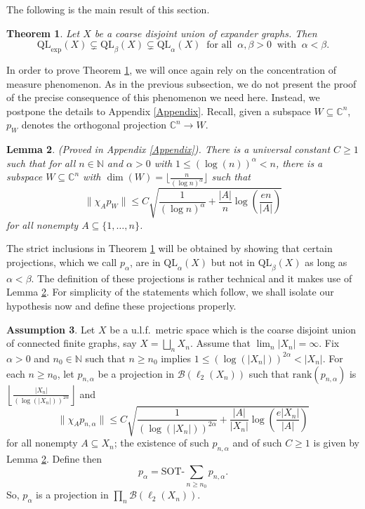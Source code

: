 \documentclass[11pt]{amsart}
\newcommand{\N}{\mathbb{N}}
\newcommand{\C}{\mathbb{C}}
\newcommand{\cB}{\mathcal{B}}
\newcommand{\SOTh}{\mathrm{SOT}\text{-}}
\numberwithin{equation}{section}
\newtheorem{theorem}{Theorem}[section]
\newtheorem{lemma}[theorem]{Lemma}
\theoremstyle{definition}
\newtheorem{assumption}[theorem]{Assumption}
\theoremstyle{remark}
\begin{document}
The following is the main result of this section.

\begin{theorem}\label{Thm.Inclusion.QL.Algebras}
    Let $X$ be a coarse disjoint union of expander graphs. Then
    \begin{equation}
        \mathrm{QL}_{\exp}(X)\subsetneq \mathrm{QL}_\beta(X)\subsetneq \mathrm{QL}_\alpha(X)  \ \text{ for all }\ \alpha,\beta>0\ \text{ with }\ \alpha<\beta. \end{equation}
\end{theorem}

In order to prove Theorem \ref{Thm.Inclusion.QL.Algebras}, we will once again rely on the concentration of measure phenomenon. As in the previous subsection, we do not present the proof of the precise consequence of this phenomenon we need here. Instead, we postpone the details to Appendix \ref{Appendix}. Recall, given a subspace $W\subseteq \C^n$, $p_W$ denotes the orthogonal projection $\C^n\to W$.

\begin{lemma}\emph{(Proved in Appendix \ref{Appendix}).}  There is a universal constant $C\geq 1$ such that for all $n\in \N$ and $\alpha>0$ with $1\leq(\log(n))^\alpha<n$, there is a subspace $W\subseteq\C^n$  with $\dim(W)=\lfloor \tfrac{n}{(\log{n})^\alpha}\rfloor$ such that
\[
\|\chi_Ap_W\|\leq C\sqrt{\frac{1}{(\log{n})^\alpha}+\frac{|A|}{n}\log\left(\frac{en}{|A|}\right)}
\]
for all nonempty $A\subseteq \{1,\ldots, n\}$.\label{LemmaGoodSubspacesQuarterPower.LARGEDIM}
\end{lemma}


The strict inclusions in Theorem \ref{Thm.Inclusion.QL.Algebras} will be obtained by showing that certain projections, which we call $p_\alpha$, are in $\mathrm{QL}_\alpha(X)$ but not in $\mathrm{QL}_\beta(X)$ as long as $\alpha<\beta$. The definition of these projections is rather technical and it makes use of Lemma \ref{LemmaGoodSubspacesQuarterPower.LARGEDIM}. For simplicity of the statements which follow, we shall isolate our hypothesis now and define these projections properly.


\begin{assumption}\label{Assumption.1}
    Let $X$ be a u.l.f.\ metric space which is the  coarse disjoint union of connected finite graphs, say $X=\bigsqcup_n X_n $. Assume that $\lim_n|X_n|=\infty$. Fix $\alpha>0$ and $n_0\in\N$ such that $n\geq n_0$ implies $1\leq(\log(|X_n|))^ {2\alpha}<|X_n|$. For each $n\geq n_0$, let $p_{n,\alpha}$ be a projection in $\cB(\ell_2(X_n))$ such that $\mathrm{rank}(p_{n,\alpha})$ is $\left\lfloor \tfrac{|X_n|}{(\log{(|X_n|)})^ {2\alpha}}\right\rfloor$ and
    \[
\|\chi_Ap_{n,\alpha}\|\leq C\sqrt{\frac{1}{(\log{(|X_n|)})^{2\alpha}}+\frac{|A|}{|X_n|}\log\left(\frac{e|X_n|}{|A|}\right)}
\]
for all nonempty $A\subseteq X_n$; the existence of such $p_{n,\alpha}$ and of such $C\geq 1$ is given by Lemma \ref{LemmaGoodSubspacesQuarterPower.LARGEDIM}. Define then
\[p_\alpha=\SOTh\sum_{n\geq n_0}p_{n,\alpha}.\]
So, $p_\alpha$ is a projection in $\prod_n\cB(\ell_2(X_n))$.
\end{assumption}
\end{document}

